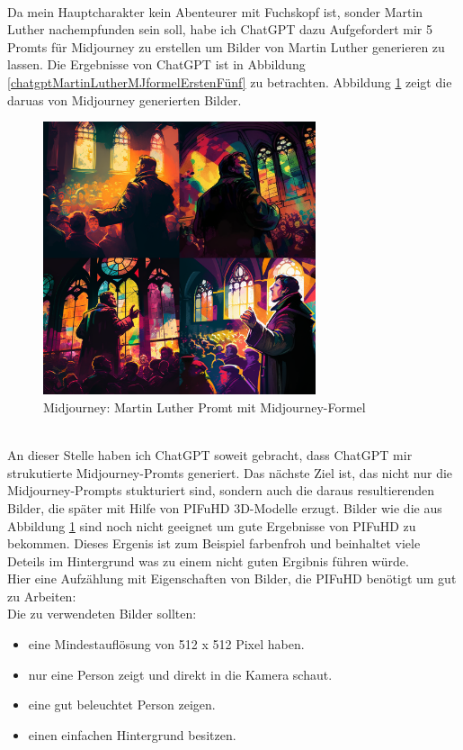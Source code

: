 \\
Da mein Hauptcharakter kein Abenteurer mit Fuchskopf ist, sonder Martin Luther nachempfunden sein soll, habe ich ChatGPT dazu Aufgefordert mir 5 Promts für Midjourney zu erstellen um Bilder von Martin Luther generieren zu lassen. Die Ergebnisse von ChatGPT ist in Abbildung \ref{chatgptMartinLutherMJformelErstenFünf} zu betrachten. Abbildung \ref{MidJourneyMLMitFormel} zeigt die daruas von Midjourney generierten Bilder.
\begin{figure}[h]
	\centering
	\includegraphics[width=8.022cm]{BilderFuerBA/MidJourneyMLMitFormel.png}
	\caption{Midjourney: Martin Luther Promt mit Midjourney-Formel}
	\label{MidJourneyMLMitFormel}
\end{figure}
\\
An dieser Stelle haben ich ChatGPT soweit gebracht, dass ChatGPT mir strukutierte Midjourney-Promts generiert. Das nächste Ziel ist, das nicht nur die Midjourney-Prompts stukturiert sind, sondern auch die daraus resultierenden Bilder, die später mit Hilfe von PIFuHD 3D-Modelle erzugt. Bilder wie die aus Abbildung  \ref{MidJourneyMLMitFormel} sind noch nicht geeignet um gute Ergebnisse von PIFuHD zu bekommen. Dieses Ergenis ist zum Beispiel farbenfroh und beinhaltet viele Deteils im Hintergrund was zu einem nicht guten Ergibnis führen würde.
\\
Hier eine Aufzählung mit Eigenschaften von Bilder, die PIFuHD benötigt um gut zu Arbeiten:
\\
Die zu verwendeten Bilder sollten:
\begin{itemize}
	\item eine Mindestauflösung von 512 x 512 Pixel haben.
	\item nur eine Person zeigt und direkt in die Kamera schaut.
	\item eine gut beleuchtet Person zeigen.
	\item einen einfachen Hintergrund besitzen.
\end{itemize}
